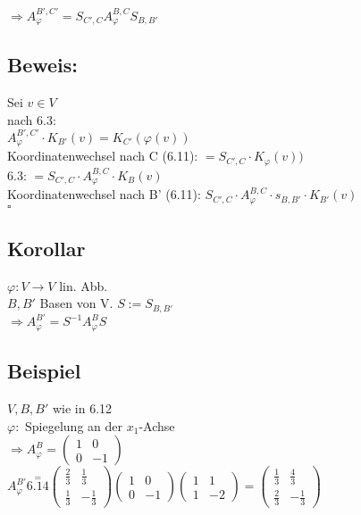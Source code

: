 $\Rightarrow A_{\varphi}^{B',C'}=S_{C',C}A_{\varphi}^{B,C}S_{B,B'}$

\subsection*{Beweis:} Sei $v\in V$\\
nach 6.3:\\
$A_{\varphi}^{B',C'}\cdot K_{B'}(v)=K_{C'}(\varphi(v))$\\
Koordinatenwechsel nach C (6.11): $= S_{C',C}\cdot K_{\varphi}(v))$\\
6.3: $=S_{C',C}\cdot A_{\varphi}^{B,C}\cdot K_B(v)$\\
Koordinatenwechsel nach B' (6.11): $S_{C',C}\cdot A_{\varphi}^{B,C}\cdot s_{B,B'}\cdot K_{B'}(v)$\\
\hspace*{13cm}$\square$

\subsection{Korollar}
$\varphi: V\rightarrow V$ lin. Abb.\\
$B,B'$ Basen von V. $S:=S_{B,B'}$\\
$\Rightarrow A_{\varphi}^{B'} = S^{-1}A_{\varphi}^B S$

\subsection{Beispiel}
$V, B, B'$ wie in 6.12\\
$\varphi:$ Spiegelung an der $x_1$-Achse\\
$\Rightarrow A_{\varphi}^B = \begin{pmatrix}1 & 0 \\ 0 & -1\end{pmatrix}$\\
$A_{\varphi}^{B'} \stackrel{=}{6.14} \begin{pmatrix}\frac{2}{3} & \frac{1}{3} \\ \frac{1}{3} & -\frac{1}{3}\end{pmatrix}\begin{pmatrix}1 & 0 \\ 0 & -1\end{pmatrix}\begin{pmatrix}1 & 1\\ 1 & -2\end{pmatrix} = \begin{pmatrix}\frac{1}{3} & \frac{4}{3} \\ \frac{2}{3} & -\frac{1}{3}\end{pmatrix}$